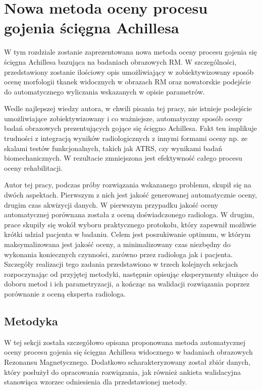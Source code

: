 \chapter{Nowa metoda oceny procesu gojenia ścięgna Achillesa}
\label{NewMethod}

W tym rozdziale zostanie zaprezentowana nowa metoda oceny procesu gojenia się ścięgna Achillesa bazująca na badaniach obrazowych RM. W szczególności, przedstawiony zostanie ilościowy opis umożliwiający w zobiektywizowany sposób ocenę morfologii tkanek widocznych w obrazach RM oraz nowatorskie podejście do automatycznego wyliczania wskazanych w opisie parametrów. 

Wedle najlepszej wiedzy autora, w chwili pisania tej pracy, nie istnieje podejście umożliwiające zobiektywizowany i co ważniejsze, automatyczny sposób oceny badań obrazowych prezentujących gojące się ścięgno Achillesa. Fakt ten implikuje trudności z integracją wyników radiologicznych z innymi formami oceny np. ze skalami testów funkcjonalnych, takich jak ATRS, czy wynikami badań biomechanicznych. W rezultacie zmniejszona jest efektywność całego procesu oceny rehabilitacji. 

Autor tej pracy, podczas próby rozwiązania wskazanego problemu, skupił się \linebreak na dwóch aspektach. Pierwszym z nich jest jakość generowanej automatycznie oceny, drugim czas akwizycji danych. W pierwszym przypadku jakość oceny automatycznej porównana została z oceną doświadczonego radiologa. W drugim, prace skupiły się wokół wyboru praktycznego protokołu, który zapewnił możliwie krótki udział pacjenta w badaniu. Celem jest poszukiwanie optimum, w którym maksymalizowana jest jakość oceny, a minimalizowany czas niezbędny do wykonania koniecznych czynności, zarówno przez radiologa jak i pacjenta. Szczegóły realizacji tego zadania przedstawiono w trzech kolejnych sekcjach rozpoczynając od przyjętej metodyki, następnie opisując eksperymenty służące do doboru metod i ich parametryzacji, \linebreak a kończąc na walidacji rozwiązania poprzez porównanie z oceną eksperta radiologa.

\section{Metodyka}
\label{seq:method}
W tej sekcji została szczegółowo opisana proponowana metoda automatycznej oceny procesu gojenia się ścięgna Achillesa widocznego w badaniach obrazowych Rezonansu Magnetycznego. Dodatkowo scharakteryzowany został zbiór danych, który posłużył do opracowania rozwiązania, jak również ankieta walidacyjna stanowiąca wzorzec odniesienia dla przedstawionej metody. 

